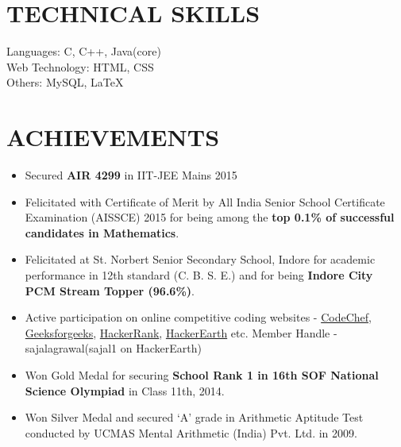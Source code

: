 \documentclass[line, margin]{res}
\begin{document}
\begin{resume}
\section{TECHNICAL SKILLS}
Languages: C, C++, Java(core)\\
Web Technology: HTML, CSS\\
Others: MySQL, \LaTeX\\

\section{ACHIEVEMENTS}
\begin{itemize}
\item Secured \textbf{AIR 4299} in IIT-JEE Mains 2015
\item Felicitated with Certificate of Merit by All India Senior School Certificate Examination (AISSCE) 2015 for being among the \textbf{top 0.1\% of successful candidates in Mathematics}.
\item Felicitated at St. Norbert Senior Secondary School, Indore for academic performance in 12th standard (C. B. S. E.) and for being \textbf{Indore City PCM Stream Topper (96.6\%)}.
\item Active participation on online competitive coding websites - \href{https://www.codechef.com/users/sajalagrawal}{CodeChef}, \href{http://www.practice.geeksforgeeks.org/user-profile.php?user=sajalagrawal}{Geeksforgeeks}, \href{https://www.hackerrank.com/sajalagrawal}{HackerRank}, \href{https://www.hackerearth.com/@sajal1}{HackerEarth} etc. Member Handle - sajalagrawal(sajal1 on HackerEarth)
\item Won Gold Medal for securing \textbf{School Rank 1 in 16th SOF National Science Olympiad} in Class 11th, 2014.
\item Won Silver Medal and secured ‘A’ grade in Arithmetic Aptitude Test conducted by UCMAS Mental Arithmetic (India) Pvt. Ltd. in 2009.
\end{itemize}


\end{resume}
\end{document}
